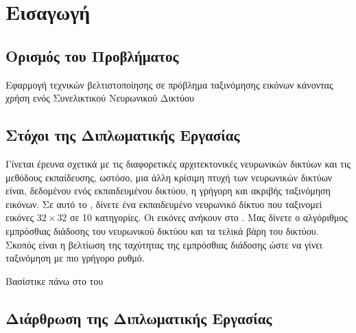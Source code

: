 \chapter{Εισαγωγή}

\section{Ορισμός του Προβλήματος}
Εφαρμογή τεχνικών βελτιστοποίησης σε πρόβλημα ταξινόμησης εικόνων κάνοντας χρήση
ενός Συνελικτικού Νευρωνικού Δικτύου

\section{Στόχοι της Διπλωματικής Εργασίας}

Γίνεται έρευνα σχετικά με τις διαφορετικές αρχιτεκτονικές νευρωνικών δικτύων και τις μεθόδους εκπαίδευσης, ωστόσο, μια άλλη κρίσιμη πτυχή των νευρωνικών δικτύων είναι, δεδομένου ενός εκπαιδευμένου δικτύου, η γρήγορη και ακριβής ταξινόμηση εικόνων. Σε αυτό το , δίνετε ένα εκπαιδευμένο νευρωνικό δίκτυο που ταξινομεί εικόνες \(32\times32\)  σε 10 κατηγορίες. Οι εικόνες ανήκουν στο . Μας δίνετε ο αλγόριθμος εμπρόσθιας διάδοσης του νευρωνικού δικτύου και τα τελικά βάρη του δικτύου.\cite{cs61c} Σκοπός είναι η βελτίωση της ταχύτητας της εμπρόσθιας διάδοσης ώστε να γίνει ταξινόμηση με πιο γρήγορο ρυθμό. 

Βασίστικε πάνω στο  του  \cite{cs61c}

\section{Διάρθρωση της Διπλωματικής Εργασίας}

